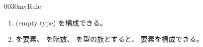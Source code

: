\documentclass[index]{subfiles}
\begin{document}
\begin{myBlock}{0030}{myRule}
  \begin{enumerate}
  \item {}(empty type)
    \myInlineMath{\myEmptyType \myElemOf \myUniverse{\myLevelZero}}を構成できる。
  \item {}を要素、
    を階数、
    を型の族とすると、
    要素を構成できる。
  \end{enumerate}
\end{myBlock}
\end{document}
